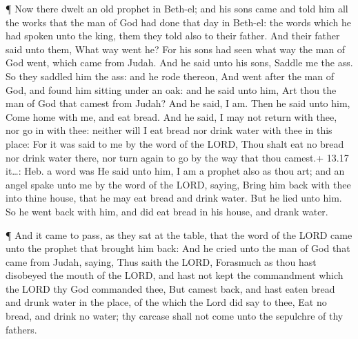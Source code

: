  ¶ Now there dwelt an old prophet in Beth-el; and his sons
came and told him all the works that the man of God had done that day in
Beth-el: the words which he had spoken unto the king, them they told
also to their father.  And their father said unto them,
What way went he? For his sons had seen what way the man of God went,
which came from Judah.  And he said unto his sons, Saddle
me the ass. So they saddled him the ass: and he rode thereon,
 And went after the man of God, and found him sitting under
an oak: and he said unto him, Art thou the man of God that camest from
Judah? And he said, I am.  Then he said unto him, Come home
with me, and eat bread.  And he said, I may not return with
thee, nor go in with thee: neither will I eat bread nor drink water with
thee in this place:  For it was said to me by the word of
the LORD, Thou shalt eat no bread nor drink water there, nor turn again
to go by the way that thou camest.+ 13.17 it\ldots: Heb. a word was
 He said unto him, I am a prophet also as thou art; and an
angel spake unto me by the word of the LORD, saying, Bring him back with
thee into thine house, that he may eat bread and drink water. But he
lied unto him.  So he went back with him, and did eat bread
in his house, and drank water.

 ¶ And it came to pass, as they sat at the table, that the
word of the LORD came unto the prophet that brought him back:
 And he cried unto the man of God that came from Judah,
saying, Thus saith the LORD, Forasmuch as thou hast disobeyed the mouth
of the LORD, and hast not kept the commandment which the LORD thy God
commanded thee,  But camest back, and hast eaten bread and
drunk water in the place, of the which the Lord did say to thee, Eat no
bread, and drink no water; thy carcase shall not come unto the sepulchre
of thy fathers.

